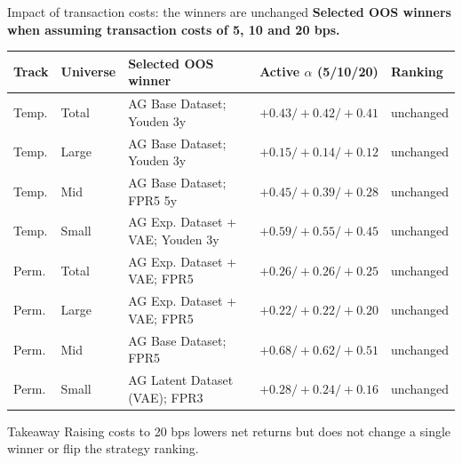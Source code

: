 \documentclass[10pt]{beamer}\usepackage[]{graphicx}\usepackage[table]{xcolor}
\newcommand{\agbase}{AG Base Dataset}
\newcommand{\aglatent}{AG Latent Dataset (VAE)}
\newcommand{\agvae}{AG Exp. Dataset + VAE}
\begin{document}
\begin{frame}{Impact of transaction costs: the winners are unchanged}
\scriptsize
\textbf{Selected OOS winners when assuming transaction costs of 5, 10 and 20 bps.}
\vspace{0.3em}

\begin{table}[ht]
\centering
\setlength{\tabcolsep}{4pt}\renewcommand{\arraystretch}{1.2}
\begin{tabular}{L{0.95cm}L{0.95cm}L{2.9cm}R{2.7cm}R{1.6cm}}
\toprule
Track & Universe & Selected OOS winner & Active $\alpha$ (5/10/20) & Ranking \\
\midrule
Temp. & Total & \agbase; Youden 3y & $+0.43 / +0.42 / +0.41$ & \textcolor{posgreen}{unchanged} \\
Temp. & Large & \agbase; Youden 3y & $+0.15 / +0.14 / +0.12$ & \textcolor{posgreen}{unchanged} \\
Temp. & Mid   & \agbase; FPR5 5y   & $+0.45 / +0.39 / +0.28$ & \textcolor{posgreen}{unchanged} \\
Temp. & Small & \agvae; Youden 3y  & $+0.59 / +0.55 / +0.45$ & \textcolor{posgreen}{unchanged} \\
Perm. & Total & \agvae; FPR5       & $+0.26 / +0.26 / +0.25$ & \textcolor{posgreen}{unchanged} \\
Perm. & Large & \agvae; FPR5       & $+0.22 / +0.22 / +0.20$ & \textcolor{posgreen}{unchanged} \\
Perm. & Mid   & \agbase; FPR5      & $+0.68 / +0.62 / +0.51$ & \textcolor{posgreen}{unchanged} \\
Perm. & Small & \aglatent; FPR3    & $+0.28 / +0.24 / +0.16$ & \textcolor{posgreen}{unchanged} \\
\bottomrule
\end{tabular}
\end{table}

\vspace{0.1em}
\begin{block}{Takeaway}
\scriptsize
Raising costs to 20 bps lowers net returns but does not change a single winner or flip the strategy ranking.
\end{block}
\end{frame}
\end{document}
